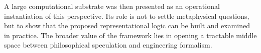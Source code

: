 \documentclass[11pt,a4paper]{article}
\begin{document}
A large computational substrate was then presented as an operational instantiation of this perspective. Its role is not to settle metaphysical questions, but to show that the proposed representational logic can be built and examined in practice. The broader value of the framework lies in opening a tractable middle space between philosophical speculation and engineering formalism.
\end{document}
